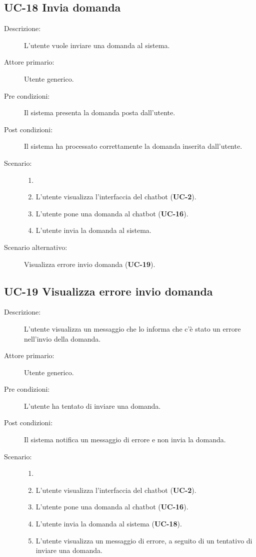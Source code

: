 \subsection{UC-18 Invia domanda}
\begin{description}
    \item[Descrizione:] L'utente vuole inviare una domanda al sistema.
    \item[Attore primario:] Utente generico.
    \item[Pre condizioni:] Il sistema presenta la domanda posta dall'utente.
    \item[Post condizioni:] Il sistema ha processato correttamente la domanda inserita dall'utente.
    \item[Scenario:]
    \begin{enumerate}
        \item[] 
        \item L’utente visualizza l'interfaccia del chatbot (\textbf{UC-2}).
        \item L’utente pone una domanda al chatbot (\textbf{UC-16}).
        \item L'utente invia la domanda al sistema.
    \end{enumerate}
    \item[Scenario alternativo:] Visualizza errore invio domanda (\textbf{UC-19}).
\end{description}

\subsection{UC-19 Visualizza errore invio domanda}
\begin{description}
    \item[Descrizione:] L'utente visualizza un messaggio che lo informa che c'è stato un errore nell'invio della domanda.
    \item[Attore primario:] Utente generico.
    \item[Pre condizioni:] L'utente ha tentato di inviare una domanda.
    \item[Post condizioni:] Il sistema notifica un messaggio di errore e non invia la domanda.
    \item[Scenario:] 
    \begin{enumerate}
        \item[] 
        \item L’utente visualizza l'interfaccia del chatbot (\textbf{UC-2}).
        \item L’utente pone una domanda al chatbot (\textbf{UC-16}).
        \item L'utente invia la domanda al sistema (\textbf{UC-18}).
        \item L'utente visualizza un messaggio di errore, a seguito di un tentativo di inviare una domanda.
    \end{enumerate}
\end{description}

